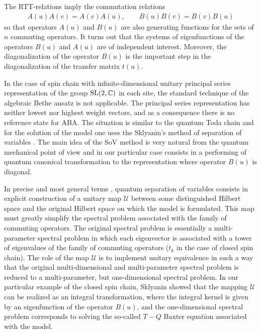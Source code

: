 \documentclass[10pt,a4paper]{amsart}
\numberwithin{equation}{section}
\begin{document}
The RTT-relations imply the commutation relations
\begin{align*}
A(u) A(v) = A(v) A(u), \qquad B(u) B(v) = B(v) B(u)
\end{align*}
so that operators $A(u)$ and $B(u)$ are also generating functions
for the sets of $n$ commuting operators.
It turns out that the systems of eigenfunctions of the operators
$B(u)$ and $A(u)$ are of independent interest.
Moreover, the diagonalization of the operator $B(u)$ is the important step in the diagonalization of the transfer matrix $t(u)$.

In the case of spin chain with infinite-dimensional unitary principal series representation of the group ${\rm SL}(2,\mathbb{C})$ in each site, the standard technique of
the algebraic Bethe ansatz \cite{F,KSk,FST} is not applicable.
The principal series representation has neither lowest nor highest weight vectors, and as a consequence there is no reference state for ABA.
The situation is similar to the quantum Toda chain and for the
solution of the model one uses the Sklyanin's method of
separation of variables \cite{KL1,KL2,KK, S1,S2}.
The main idea of the SoV method is very natural from the quantum
mechanical point of view and in our particular case consists in a performing
of quantum canonical transformation \cite{Fock2, Fock1} to the representation where operator $B(u)$ is diagonal.

In precise and most general terms \cite{KK, S1,S2}, quantum separation of variables
consists in explicit construction of a unitary map $\mathcal{U}$ between some
distinguished Hilbert space and the original Hilbert space on which the model is formulated. This map must greatly simplify the spectral problem associated with
the family of commuting operators.
The original spectral problem is essentially a multi-parameter spectral problem
in which each eigenvector is associated with a tower of eigenvalues of the
family of commuting operators
($t_k$ in the case of closed spin chain). The role of the map $\mathcal{U}$ is to implement unitary equivalence in such a way that the original multi-dimensional and multi-parameter spectral problem is reduced to a multi-parameter, but one-dimensional spectral problem.
In our particular example of the closed spin chain, Sklyanin showed
that the mapping $\mathcal{U}$ can be realized as an integral transformation,
where the integral kernel is given by an eigenfunction of the operator $B(u)$, and
the one-dimensional spectral problem corresponds to solving the so-called
$T-Q$ Baxter equation associated with the model.
\end{document}
